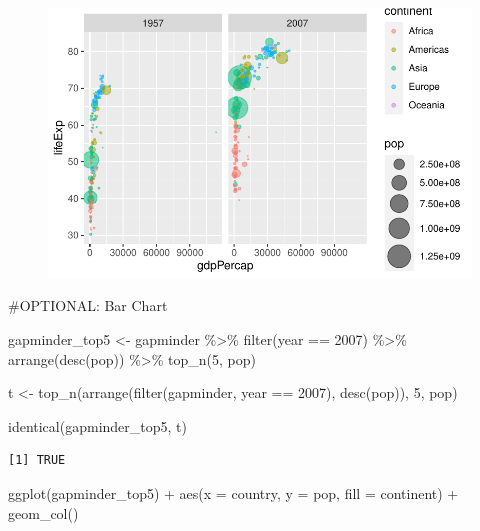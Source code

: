 \documentclass[
  letterpaper,
  DIV=11,
  numbers=noendperiod]{scrartcl}
\newenvironment{Shaded}{\begin{snugshade}}{\end{snugshade}}
\newcommand{\AttributeTok}[1]{\textcolor[rgb]{0.40,0.45,0.13}{#1}}
\newcommand{\DecValTok}[1]{\textcolor[rgb]{0.68,0.00,0.00}{#1}}
\newcommand{\FunctionTok}[1]{\textcolor[rgb]{0.28,0.35,0.67}{#1}}
\newcommand{\NormalTok}[1]{\textcolor[rgb]{0.00,0.23,0.31}{#1}}
\newcommand{\OtherTok}[1]{\textcolor[rgb]{0.00,0.23,0.31}{#1}}
\newcommand{\SpecialCharTok}[1]{\textcolor[rgb]{0.37,0.37,0.37}{#1}}
\begin{document}
\begin{figure}[H]

{\centering \includegraphics{class05_files/figure-pdf/unnamed-chunk-4-2.pdf}

}

\end{figure}

\#OPTIONAL: Bar Chart

\begin{Shaded}
\begin{Highlighting}[]
\NormalTok{gapminder\_top5 }\OtherTok{\textless{}{-}}\NormalTok{ gapminder }\SpecialCharTok{\%\textgreater{}\%} 
  \FunctionTok{filter}\NormalTok{(year }\SpecialCharTok{==} \DecValTok{2007}\NormalTok{) }\SpecialCharTok{\%\textgreater{}\%} 
  \FunctionTok{arrange}\NormalTok{(}\FunctionTok{desc}\NormalTok{(pop)) }\SpecialCharTok{\%\textgreater{}\%} 
  \FunctionTok{top\_n}\NormalTok{(}\DecValTok{5}\NormalTok{, pop)}

\NormalTok{t }\OtherTok{\textless{}{-}} \FunctionTok{top\_n}\NormalTok{(}\FunctionTok{arrange}\NormalTok{(}\FunctionTok{filter}\NormalTok{(gapminder, year }\SpecialCharTok{==} \DecValTok{2007}\NormalTok{), }\FunctionTok{desc}\NormalTok{(pop)), }\DecValTok{5}\NormalTok{, pop)}

\FunctionTok{identical}\NormalTok{(gapminder\_top5, t)}
\end{Highlighting}
\end{Shaded}

\begin{verbatim}
[1] TRUE
\end{verbatim}

\begin{Shaded}
\begin{Highlighting}[]
\FunctionTok{ggplot}\NormalTok{(gapminder\_top5) }\SpecialCharTok{+}
  \FunctionTok{aes}\NormalTok{(}\AttributeTok{x =}\NormalTok{ country, }\AttributeTok{y =}\NormalTok{ pop, }\AttributeTok{fill =}\NormalTok{ continent) }\SpecialCharTok{+} 
  \FunctionTok{geom\_col}\NormalTok{()}
\end{Highlighting}
\end{Shaded}
\end{document}

